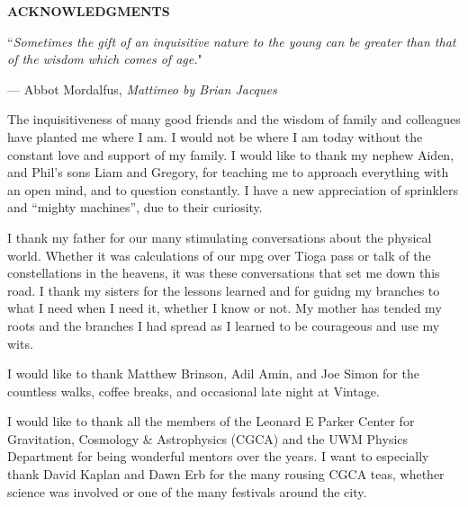 \documentclass[12pt,notitlepage]{report}
\begin{document}
\tableofcontents

\afterpreface

\newpage

\begin{center}
{\Large \bf ACKNOWLEDGMENTS}
\end{center}


\singlespace
\epigraph{``\emph{Sometimes the gift of an inquisitive nature to the young can be greater than that of the wisdom which comes of age.}"}{--- \textup{Abbot Mordalfus}, \textit{Mattimeo by Brian Jacques}}

\dblspace

The inquisitiveness of many good friends and the wisdom of family and colleagues have planted me where I am.
I would not be where I am today without the constant love and support of my family. 
I would like to thank my nephew Aiden, and Phil's sons Liam and Gregory, for teaching me to approach everything with an open mind, and to question constantly.
I have a new appreciation of sprinklers and ``mighty machines'', due to their curiosity.

I thank my father for our many stimulating conversations about the physical world. 
Whether it was calculations of our mpg over Tioga pass or talk of the constellations in the heavens, it was these conversations that set me down this road.
I thank my sisters for the lessons learned and for guidng my branches to what I need when I need it, whether I know or not.
My mother has tended my roots and the branches I had spread as I learned to be courageous and use my wits. 

I would like to thank Matthew Brinson, Adil Amin, and Joe Simon for the countless walks, coffee breaks, and occasional late night at Vintage. 

I would like to thank all the members of the Leonard E Parker Center for Gravitation, Cosmology \& Astrophysics (CGCA) and the UWM Physics Department 
for being wonderful mentors over the years. 
I want to especially thank David Kaplan and Dawn Erb for the many rousing CGCA teas, whether science was involved or one of the many festivals around the city. 
\end{document}
